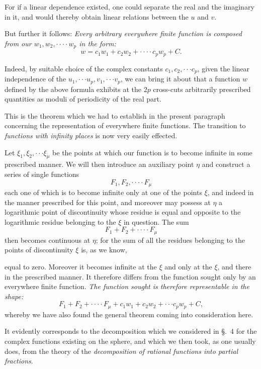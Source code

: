 \documentclass{article}
\begin{document}
For if a linear dependence existed, one could separate the real and the imaginary in it, and would thereby obtain linear relations between the $u$ and $v$.

But further it follows: \emph{Every arbitrary everywhere finite function is composed from our $w_{1}, w_{2}, \cdot\cdot\cdot\cdot w_{p}$ in the form:}
\[ w = c_{1}w_{1} + c_{2}w_{2} + \cdot\cdot\cdot\cdot c_{p}w_{p} + C. \]

Indeed, by suitable choice of the complex constants $c_{1}, c_{2}, \cdot\cdot\cdot c_{p}$, given the linear independence of the $u_{1}, \cdot\cdot\cdot u_{p}, v_{1}, \cdot\cdot\cdot v_{p}$, we can bring it about that a function $w$ defined by the above formula exhibits at the $2p$ cross-cuts arbitrarily prescribed quantities as moduli of periodicity of the real part.

This is the theorem which we had to establish in the present paragraph concerning the representation of everywhere finite functions. The transition to \emph{functions with infinity places} is now very easily effected.

Let $\xi_{1}, \xi_{2}, \cdot\cdot\cdot \xi_{\mu}$ be the points at which our function is to become infinite in some prescribed manner. We will then introduce an auxiliary point $\eta$ and construct a series of single functions
\[ F_{1}, F_{2}, \cdot\cdot\cdot\cdot F_{\mu} \]
each one of which is to become infinite only at one of the points $\xi$, and indeed in the manner prescribed for this point, and moreover may possess at $\eta$ a logarithmic point of discontinuity whose residue is equal and opposite to the logarithmic residue belonging to the $\xi$ in question. The sum
\[ F_{1} + F_{2} + \cdot\cdot\cdot\cdot F_{\mu} \]
then becomes continuous at $\eta$; for the sum of all the residues belonging to the points of discontinuity $\xi$ is, as we know,

equal to zero. Moreover it becomes infinite at the $\xi$ and only at the $\xi$, and there in the prescribed manner. It therefore differs from the function sought only by an everywhere finite function. \emph{The function sought is therefore representable in the shape:}
\[ F_{1} + F_{2} + \cdot\cdot\cdot\cdot F_{\mu} + c_{1}w_{1} + c_{2}w_{2} + \cdot\cdot\cdot c_{p}w_{p} + C, \]
whereby we have also found the general theorem coming into consideration here.

It evidently corresponds to the decomposition which we considered in §.~4 for the complex functions existing on the sphere, and which we then took, as one usually does, from the theory of the \emph{decomposition of rational functions into partial fractions}.
\end{document}
